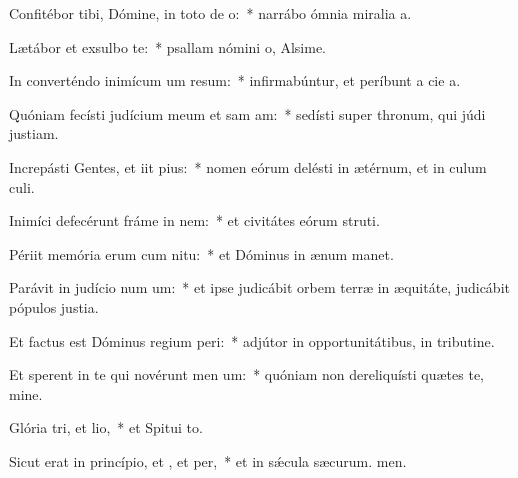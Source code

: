 \item Confitébor tibi, Dómine, in toto de o:~* narrábo ómnia miralia a.
\item Lætábor et exsulbo  te:~* psallam nómini o, Alsime.
\item In converténdo inimícum um resum:~* infirmabúntur, et períbunt a cie a.
\item Quóniam fecísti judícium meum et sam am:~* sedísti super thronum, qui júdi justiam.
\item Increpásti Gentes, et iit pius:~* nomen eórum delésti in ætérnum, et in culum culi.
\item Inimíci defecérunt fráme in nem:~* et civitátes eórum struti.
\item Périit memória erum cum nitu:~* et Dóminus in ænum manet.
\item Parávit in judício num um:~* et ipse judicábit orbem terræ in æquitáte, judicábit pópulos  justia.
\item Et factus est Dóminus regium peri:~* adjútor in opportunitátibus, in tributine.
\item Et sperent in te qui novérunt men um:~* quóniam non dereliquísti quætes te, mine.
\item Glória tri, et lio,~* et Spitui to.
\item Sicut erat in princípio, et , et per,~* et in sǽcula sæcurum. men.

